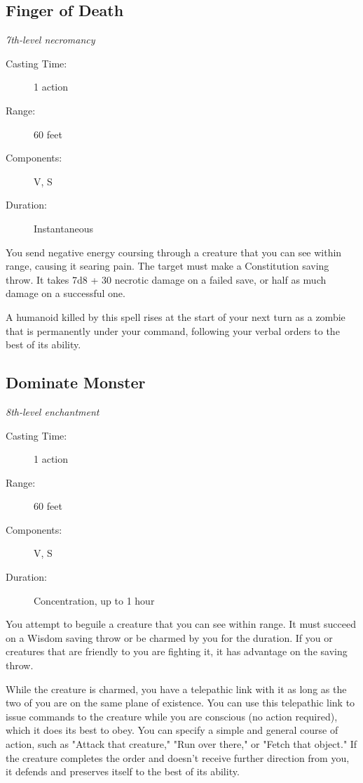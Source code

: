 \documentclass[letterpaper,10pt,twoside,twocolumn,openany]{book}
\begin{document}
\subsection{Finger of Death} \hypertarget{Finger of Death}{}
\begin{hangingpar}
	\textit{7th-level necromancy}
\end{hangingpar}
\begin{description}
	\item[Casting Time:] 1 action
	\item[Range:] 60 feet
	\item[Components:] V, S
	\item[Duration:] Instantaneous 
\end{description}

You send negative energy coursing through a creature that you can see within range, causing it searing pain. The target must make a Constitution saving throw. It takes 7d8 + 30 necrotic damage on a failed save, or half as much damage on a successful one.

A humanoid killed by this spell rises at the start of your next turn as a zombie that is permanently under your command, following your verbal orders to the best of its ability.

\subsection{Dominate Monster} \hypertarget{Dominate Monster}{}
\begin{hangingpar}
	\textit{8th-level enchantment}
\end{hangingpar}
\begin{description}
	\item[Casting Time:] 1 action
	\item[Range:] 60 feet 
	\item[Components:] V, S 
	\item[Duration:] Concentration, up to 1 hour 
\end{description}

You attempt to beguile a creature that you can see within range. It must succeed on a Wisdom saving throw or be charmed by you for the duration. If you or creatures that are friendly to you are fighting it, it has advantage on the saving throw.

While the creature is charmed, you have a telepathic link with it as long as the two of you are on the same plane of existence. You can use this telepathic link to issue commands to the creature while you are conscious (no action required), which it does its best to obey. You can specify a simple and general course of action, such as "Attack that creature," "Run over there," or "Fetch that object." If the creature completes the order and doesn't receive further direction from you, it defends and preserves itself to the best of its ability.
\end{document}
